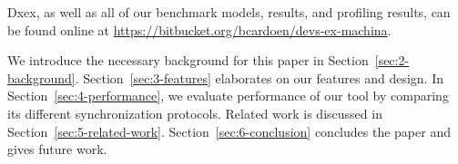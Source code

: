 Dxex, as well as all of our benchmark models, results, and profiling results, can be found online at \url{https://bitbucket.org/bcardoen/devs-ex-machina}.

We introduce the necessary background for this paper in Section~\ref{sec:2-background}.
Section~\ref{sec:3-features} elaborates on our features and design.
In Section~\ref{sec:4-performance}, we evaluate performance of our tool by comparing its different synchronization protocols.
Related work is discussed in Section~\ref{sec:5-related-work}.
Section~\ref{sec:6-conclusion} concludes the paper and gives future work.
